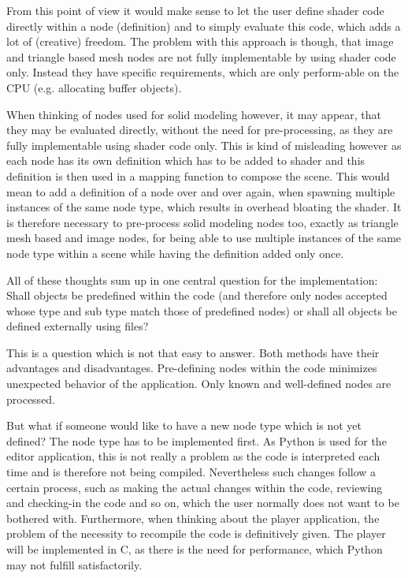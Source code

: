 \documentclass[
    a4paper,      %
    10pt,         %
    openright,    %
    notitlepage,  %
    parskip=half, %
]{scrreprt}       %
\theoremstyle{definition}                    %
\begin{document}
From this point of view it would make sense to let the user define shader
code directly within a node (definition) and to simply evaluate this code, which
adds a lot of (creative) freedom. The problem with this approach is though, that
image and triangle based mesh nodes are not fully implementable by using shader
code only. Instead they have specific requirements, which are only perform-able
on the CPU (e.g. allocating buffer objects).

When thinking of nodes used for solid modeling however, it may appear, that they
may be evaluated directly, without the need for pre-processing, as they are
fully implementable using shader code only. This is kind of misleading however
as each node has its own definition which has to be added to shader and this
definition is then used in a mapping function to compose the scene. This would
mean to add a definition of a node over and over again, when spawning multiple
instances of the same node type, which results in overhead bloating the shader.
It is therefore necessary to pre-process solid modeling nodes too, exactly as
triangle mesh based and image nodes, for being able to use multiple instances of
the same node type within a scene while having the definition added only once.

All of these thoughts sum up in one central question for the implementation:
Shall objects be predefined within the code (and therefore only nodes accepted
whose type and sub type match those of predefined nodes) or shall all objects be
defined externally using files?

This is a question which is not that easy to answer. Both methods have their
advantages and disadvantages. Pre-defining nodes within the code minimizes
unexpected behavior of the application. Only known and well-defined nodes are
processed.

But what if someone would like to have a new node type which is not yet defined?
The node type has to be implemented first. As Python is used for the editor
application, this is not really a problem as the code is interpreted each time
and is therefore not being compiled. Nevertheless such changes follow a certain
process, such as making the actual changes within the code, reviewing and
checking-in the code and so on, which the user normally does not want to be
bothered with. Furthermore, when thinking about the player application, the
problem of the necessity to recompile the code is definitively given. The player
will be implemented in C, as there is the need for performance, which Python may
not fulfill satisfactorily.
\end{document}
